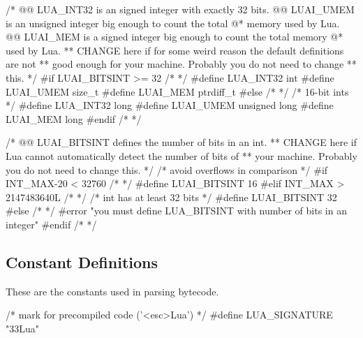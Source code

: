 
\begin{LuaCCode}[caption=Definition of \keyword{LUA\_INT32} from \filename{luaconf.h}]
/*
@@ LUA_INT32 is an signed integer with exactly 32 bits.
@@ LUAI_UMEM is an unsigned integer big enough to count the total
@* memory used by Lua.
@@ LUAI_MEM is a signed integer big enough to count the total memory
@* used by Lua.
** CHANGE here if for some weird reason the default definitions are not
** good enough for your machine. Probably you do not need to change
** this.
*/
#if LUAI_BITSINT >= 32		/* { */
#define LUA_INT32	int
#define LUAI_UMEM	size_t
#define LUAI_MEM	ptrdiff_t
#else				/* }{ */
/* 16-bit ints */
#define LUA_INT32	long
#define LUAI_UMEM	unsigned long
#define LUAI_MEM	long
#endif				/* } */
\end{LuaCCode}


\begin{LuaCCode}[caption=Definition of \keyword{LUA\_BITSINT} from \filename{luaconf.h}]
/*
@@ LUAI_BITSINT defines the number of bits in an int.
** CHANGE here if Lua cannot automatically detect the number of bits of
** your machine. Probably you do not need to change this.
*/
/* avoid overflows in comparison */
#if INT_MAX-20 < 32760		/* { */
#define LUAI_BITSINT	16
#elif INT_MAX > 2147483640L	/* }{ */
/* int has at least 32 bits */
#define LUAI_BITSINT	32
#else				/* }{ */
#error "you must define LUA_BITSINT with number of bits in an integer"
#endif				/* } */
\end{LuaCCode}


\subsection{Constant Definitions}

	These are the constants used in parsing bytecode.


\begin{LuaCCode}[caption=Definition of \keyword{LUA\_SIGNATURE} from \filename{lua.h}]
/* mark for precompiled code ('<esc>Lua') */
#define LUA_SIGNATURE	"\033Lua"
\end{LuaCCode}

